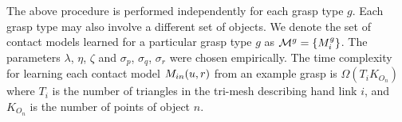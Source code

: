 The above procedure is performed independently for each grasp type $g$. Each grasp type may also involve a different set of objects. We denote the set of contact models learned for a particular grasp type $g$ as $\mathcal{M}^g=\{M^g_i\}$. The parameters $\lambda$, $\eta$, $\zeta$ and $\sigma_{p}$, $\sigma_{q}$, $\sigma_{r}$ were chosen empirically. The time complexity for learning each contact model $M_{in}(u, r)$ from an example grasp is $\Omega(T_i K_{O_n})$ where $T_i$ is the number of triangles in the tri-mesh describing hand link $i$, and $K_{O_n}$ is the number of points of object $n$.


%
%
